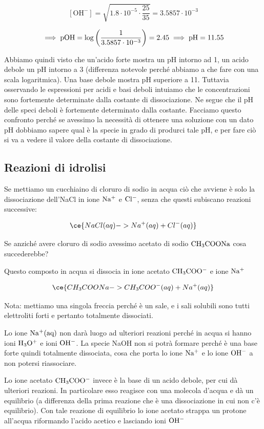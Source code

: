 $$[\text{OH}^-]=\sqrt{1.8 \cdot 10^{-5} \cdot \frac{25}{35}}=3.5857 \cdot 10^{-3}$$

$$\implies \rm pOH= \log \left( \frac{1}{3.5857 \cdot 10^{-3}} \right)=2.45 \implies pH=11.55$$

Abbiamo quindi visto che un'acido forte mostra un pH intorno ad 1, un acido debole un pH intorno a 3 (differenza notevole perché abbiamo a che fare con una scala logaritmica). Una base debole mostra pH superiore a 11. Tuttavia osservando le espressioni per acidi e basi deboli intuiamo che le concentrazioni sono fortemente determinate dalla costante di dissociazione. Ne segue che il pH delle speci deboli è fortemente determinato dalla costante. Facciamo questo confronto perché se avessimo la necessità di ottenere una soluzione con un dato pH dobbiamo sapere qual è la specie in grado di produrci tale pH, e per fare ciò si va a vedere il valore della costante di dissociazione.

\subsection{Reazioni di idrolisi}
Se mettiamo un cucchiaino di cloruro di sodio in acqua ciò che avviene è solo la dissociazione dell'NaCl in ione $\rm Na^+$ e $\rm Cl^-$, senza che questi subiscano reazioni successive:

$$\ce{NaCl(aq) -> Na^+(aq) + Cl^-(aq)}$$

Se anziché avere cloruro di sodio avessimo acetato di sodio $\rm CH_3COONa$ cosa succederebbe?

Questo composto in acqua si dissocia in ione acetato $\rm CH_3COO^-$ e ione $\rm Na^+$

$$\ce{CH_3COONa -> CH_3COO^-(aq) + Na^+(aq)}$$

Nota: mettiamo una singola freccia perché è un sale, e i sali solubili sono tutti elettroliti forti e pertanto totalmente dissociati.

Lo ione $\rm Na^+(aq)$ non darà luogo ad ulteriori reazioni perché in acqua si hanno ioni $\rm H_3O^+$ e ioni $\rm OH^-$. La specie NaOH non si potrà formare perché è una base forte quindi totalmente dissociata, cosa che porta lo ione $\rm Na^+$ e lo ione $\rm OH^-$ a non potersi riassociare.

Lo ione acetato $\rm CH_3COO^-$ invece è la base di un acido debole, per cui dà ulteriori reazioni. In particolare esso reagisce con una molecola d'acqua e dà un equilibrio (a differenza della prima reazione che è una dissociazione in cui non c'è equilibrio). Con tale reazione di equilibrio lo ione acetato strappa un protone all'acqua riformando l'acido acetico e lasciando ioni $\rm OH^-$

